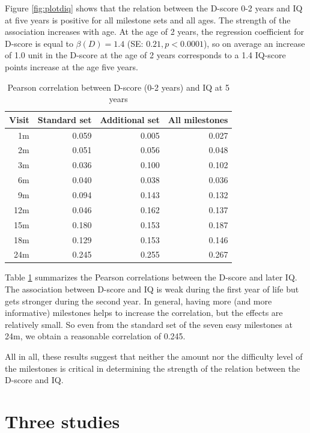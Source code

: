 \documentclass[
]{book}
\begin{document}
Figure \ref{fig:plotdiq} shows that the relation between the D-score 0-2 years and IQ at five years is positive for all milestone sets and all ages. The strength of the association increases with age. At the age of 2 years, the regression coefficient for D-score is equal to \(\beta(D) = 1.4\) (SE: \(0.21, p < 0.0001\)), so on average an increase of 1.0 unit in the D-score at the age of 2 years corresponds to a 1.4 IQ-score points increase at the age five years.

\begin{table}

\caption{\label{tab:cordiq}Pearson correlation between D-score (0-2 years) and IQ at 5 years}
\centering
\begin{tabular}[t]{rrrr}
\toprule
Visit & Standard set & Additional set & All milestones\\
\midrule
1m & 0.059 & 0.005 & 0.027\\
2m & 0.051 & 0.056 & 0.048\\
3m & 0.036 & 0.100 & 0.102\\
6m & 0.040 & 0.038 & 0.036\\
9m & 0.094 & 0.143 & 0.132\\
\addlinespace
12m & 0.046 & 0.162 & 0.137\\
15m & 0.180 & 0.153 & 0.187\\
18m & 0.129 & 0.153 & 0.146\\
24m & 0.245 & 0.255 & 0.267\\
\bottomrule
\end{tabular}
\end{table}

Table \ref{tab:cordiq} summarizes the Pearson correlations between the D-score and later IQ. The association between D-score and IQ is weak during the first year of life but gets stronger during the second year. In general, having more (and more informative) milestones helps to increase the correlation, but the effects are relatively small. So even from the standard set of the seven easy milestones at 24m, we obtain a reasonable correlation of 0.245.

All in all, these results suggest that neither the amount nor the difficulty level of the milestones is critical in determining the strength of the relation between the D-score and IQ.

\hypertarget{ch:threestudies}{%
\chapter{Three studies}\label{ch:threestudies}}
\end{document}
